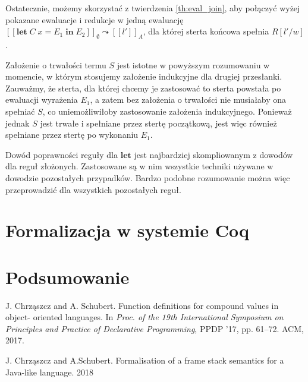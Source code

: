 \documentclass[]{pracamgr}
\renewcommand \| {\hspace{0.75em} | \hspace{0.75em} }
\renewcommand \[ {[\![}
\renewcommand \] {]\!]}
\newcommand \eval [1] {\overset{#1}{\leadsto}}
\theoremstyle{definition}
\newcommand{\jlet}{\mathbf{let}\xspace}
\newcommand{\jin}{\mathbf{in}\xspace}
\newcommand{\letin}[4]{\jlet\; #1\; #2 = #3\; \jin\; #4\xspace}
\begin{document}
Ostatecznie, możemy skorzystać z twierdzenia \ref{th:eval_join}, aby połączyć wyżej pokazane ewaluacje
i redukcje w jedną ewaluację 
$\[ \letin{C}{x}{E_1}{E_2}\]_\emptyset \eval{} \[ l' \]_A$, dla której sterta końcowa spełnia $R[l'/w]$.

Założenie o trwałości termu $S$ jest istotne w powyższym rozumowaniu w momencie, w którym stosujemy
założenie indukcyjne dla drugiej przesłanki. Zauważmy, że sterta, dla której chcemy je zastosować
to sterta powstała po ewaluacji wyrażenia $E_1$, a zatem bez założenia o trwałości nie musiałaby
ona spełniać $S$, co uniemożliwiłoby zastosowanie założenia indukcyjnego.
Ponieważ jednak $S$ jest trwałe i spełniane przez stertę początkową, jest więc również spełniane
przez stertę po wykonaniu $E_1$.

Dowód poprawności reguły dla $\jlet$ jest najbardziej skompliowanym z dowodów dla reguł złożonych.
Zastosowane są w nim wszystkie techniki używane w dowodzie pozostałych przypadków.
Bardzo podobne rozumowanie można więc przeprowadzić dla wszystkich pozostałych reguł.

\chapter{Formalizacja w systemie Coq}

\chapter{Podsumowanie}

\appendix
\begin{thebibliography}{99}

 J. Chrząszcz and A. Schubert. Function definitions for compound values in object-
oriented languages. In \textit{Proc. of the 19th International Symposium on Principles
and Practice of Declarative Programming}, PPDP ’17, pp. 61–72. ACM, 2017.

 J. Chrząszcz and A.Schubert. Formalisation of a frame stack semantics for a Java-like language. 2018

\end{thebibliography}
\end{document}
